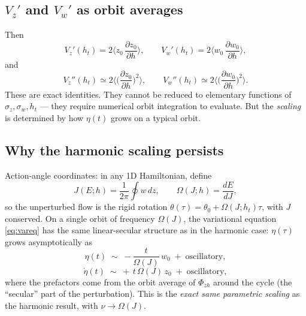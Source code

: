 \documentclass[11pt]{article}
\begin{document}
\subsection{$V_z'$ and $V_w'$ as orbit averages}

Then
\begin{equation}
V_z'(h_t) = 2\Big\langle z_0\,\frac{\partial z_0}{\partial h}\Big\rangle,\qquad
V_w'(h_t) = 2\Big\langle w_0\,\frac{\partial w_0}{\partial h}\Big\rangle,
\end{equation}
and
\begin{equation}
V_z''(h_t)\simeq 2\Big\langle\!\Big(\frac{\partial z_0}{\partial h}\Big)^{\!2}\Big\rangle,
\qquad
V_w''(h_t)\simeq 2\Big\langle\!\Big(\frac{\partial w_0}{\partial h}\Big)^{\!2}\Big\rangle.
\label{eq:Vsecondreal}
\end{equation}
These are exact identities. They cannot be reduced to elementary functions of
$\sigma_z, \sigma_w, h_t$ — they require numerical orbit integration to evaluate. But
the \emph{scaling} is determined by how $\eta(t)$ grows on a typical orbit.

\subsection{Why the harmonic scaling persists}

Action-angle coordinates: in any 1D Hamiltonian, define
\begin{equation}
J(E;h) = \frac{1}{2\pi}\oint w\,dz,
\qquad
\Omega(J;h) = \frac{dE}{dJ},
\end{equation}
so the unperturbed flow is the rigid rotation
$\theta(\tau) = \theta_0 + \Omega(J;h_t)\tau$, with $J$ conserved. On a single orbit
of frequency $\Omega(J)$, the variational equation \eqref{eq:vareq} has the same
linear-secular structure as in the harmonic case: $\eta(\tau)$ grows asymptotically
as
\begin{equation}
\eta(t) \;\sim\; -\frac{t}{\Omega(J)}\,w_0\;+\;\text{oscillatory},
\end{equation}
\begin{equation}
\dot\eta(t) \;\sim\; +\,t\,\Omega(J)\,z_0\;+\;\text{oscillatory},
\end{equation}
where the prefactors come from the orbit average of $\Phi_{zh}$ around the cycle (the
``secular'' part of the perturbation). This is the \emph{exact same parametric
scaling} as the harmonic result, with $\nu\to\Omega(J)$.
\end{document}
